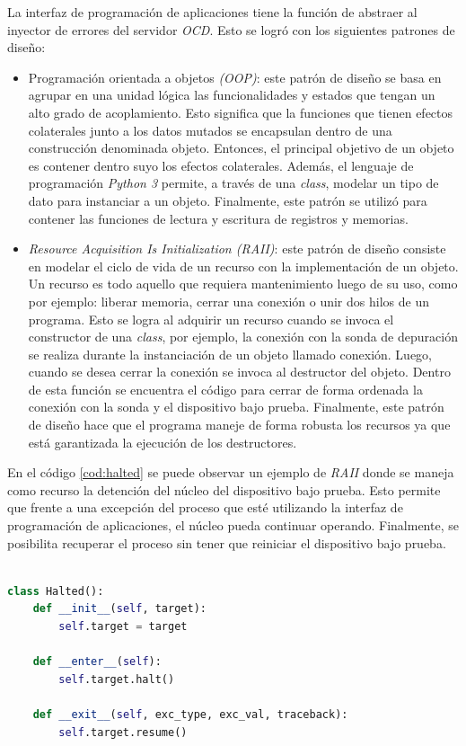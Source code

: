 La interfaz de programación de aplicaciones tiene la función de abstraer al inyector de errores del servidor \emph{OCD}.
Esto se logró con los siguientes patrones de diseño:

\begin{itemize}
    \item Programación orientada a objetos \emph{(OOP)}: este patrón de diseño se basa en agrupar en una unidad lógica las funcionalidades y estados que tengan un alto grado de acoplamiento.
        Esto significa que la funciones que tienen efectos colaterales junto a los datos mutados se encapsulan dentro de una construcción denominada objeto.
        Entonces, el principal objetivo de un objeto es contener dentro suyo los efectos colaterales.
        Además, el lenguaje de programación \emph{Python 3} permite, a través de una \emph{class}, modelar un tipo de dato para instanciar a un objeto.
        Finalmente, este patrón se utilizó para contener las funciones de lectura y escritura de registros y memorias.
    \item \emph{Resource Acquisition Is Initialization (RAII)}: este patrón de diseño consiste en modelar el ciclo de vida de un recurso con la implementación de un objeto.
        Un recurso es todo aquello que requiera mantenimiento luego de su uso, como por ejemplo: liberar memoria, cerrar una conexión o unir dos hilos de un programa.
        Esto se logra al adquirir un recurso cuando se invoca el constructor de una \emph{class}, por ejemplo, la conexión con la sonda de depuración se realiza durante la instanciación de un objeto llamado conexión.
        Luego, cuando se desea cerrar la conexión se invoca al destructor del objeto.
        Dentro de esta función se encuentra el código para cerrar de forma ordenada la conexión con la sonda y el dispositivo bajo prueba.
        Finalmente, este patrón de diseño hace que el programa maneje de forma robusta los recursos ya que está garantizada la ejecución de los destructores.
\end{itemize}

En el código \ref{cod:halted} se puede observar un ejemplo de \emph{RAII} donde se maneja como recurso la detención del núcleo del dispositivo bajo prueba.
Esto permite que frente a una excepción del proceso que esté utilizando la interfaz de programación de aplicaciones, el núcleo pueda continuar operando.
Finalmente, se posibilita recuperar el proceso sin tener que reiniciar el dispositivo bajo prueba.

\begin{lstlisting}[language=Python,label=cod:halted,caption=Ejemplo de \emph{Resource Acquisition Is Initialization (RAII)}.]  % Start your code-block

class Halted():
    def __init__(self, target):
        self.target = target

    def __enter__(self):
        self.target.halt()

    def __exit__(self, exc_type, exc_val, traceback):
        self.target.resume()

\end{lstlisting}

